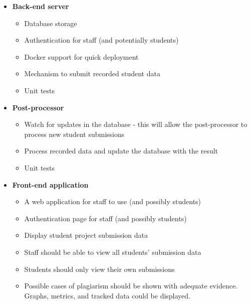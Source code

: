 \begin{itemize}
\begin{itemize}
    \item \textbf{Back-end server}
    \begin{itemize}
      \item Database storage
      \item Authentication for staff (and potentially students)
      \item Docker support for quick deployment
      \item Mechanism to submit recorded student data
      \item Unit tests
    \end{itemize}

    \item \textbf{Post-processor}
    \begin{itemize}
      \item Watch for updates in the database - this will allow the post-processor to process new student submissions
      \item Process recorded data and update the database with the result
      \item Unit tests
    \end{itemize}

    \item \textbf{Front-end application}
    \begin{itemize}
      \item A web application for staff to use (and possibly students)
      \item Authentication page for staff (and possibly students)
      \item Display student project submission data
      \item Staff should be able to view all students' submission data
      \item Students should only view their own submissions
      \item Possible cases of plagiarism should be shown with adequate evidence. Graphs, metrics, and tracked data could be displayed.
    \end{itemize}
  \end{itemize}
\end{itemize}

